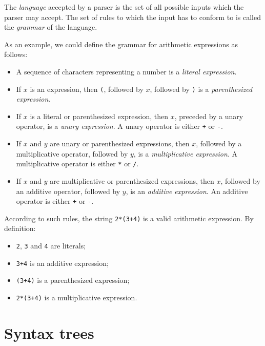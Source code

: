 \documentclass[11pt, american, draft]{PhdThesis}
\begin{document}
  The \emph{language} accepted by a parser is the set of all possible inputs which the parser may
  accept. The set of rules to which the input has to conform to is called the \emph{grammar} of the
  language.

  As an example, we could define the grammar for arithmetic expressions as follows:

  \begin{itemize}[noitemsep,topsep=0pt]
    \item A sequence of characters representing a number is a \emph{literal expression}.

    \item If $x$ is an expression, then \verb$($, followed by $x$, followed by \verb$)$ is a
          \emph{parenthesized expression}.

    \item If $x$ is a literal or parenthesized expression, then $x$, preceded by a unary operator,
          is a \emph{unary expression}. A unary operator is either \verb$+$ or \verb$-$.

    \item If $x$ and $y$ are unary or parenthesized expressions, then $x$, followed by a
          multiplicative operator, followed by $y$, is a \emph{multiplicative expression}. A
          multiplicative operator is either \verb$*$ or \verb$/$.

    \item If $x$ and $y$ are multiplicative or parenthesized expressions, then $x$, followed by an
          additive operator, followed by $y$, is an \emph{additive expression}. An additive operator
          is either \verb$+$ or \verb$-$.
  \end{itemize}

  According to such rules, the string \verb$2*(3+4)$ is a valid arithmetic expression. By
  definition:

  \begin{itemize}[noitemsep,topsep=0pt]
    \item \verb$2$, \verb$3$ and \verb$4$ are literals;
    \item \verb$3+4$ is an additive expression;
    \item \verb$(3+4)$ is a parenthesized expression;
    \item \verb$2*(3+4)$ is a multiplicative expression.
  \end{itemize}

  \section{Syntax trees}
\end{document}
